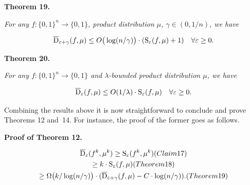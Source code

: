 \documentclass[10pt,a4paper]{article}
\begin{document}


\par\medskip\noindent\textbf{
\textbf{Theorem 19}\textbf{.}
}\par



\emph{For any $f\colon\{0,1\}^{n}\to\{0,1\}$, product distribution $\mu$, $\gamma\in(0,1/n)$, we have}\par


\[\begin{gathered}
\overline{{\textup{D}}}_{\varepsilon+\gamma}(f,\mu)\leq O\big{(}\log(n/\gamma)\big{)}\cdot({\textup{S}}_{\varepsilon}(f,\mu)+1)\quad\forall\varepsilon\geq 0.
\end{gathered}\]







\par\medskip\noindent\textbf{
\textbf{Theorem 20}\textbf{.}
}\par



\emph{For any $f\colon\{0,1\}^{n}\to\{0,1\}$ and $\lambda$-bounded product distribution $\mu$, we have}\par


\[\begin{gathered}
\overline{{\textup{D}}}_{\varepsilon}(f,\mu)\leq O(1/\lambda)\cdot{\textup{S}}_{\varepsilon}(f,\mu)\quad\forall\varepsilon\geq 0.
\end{gathered}\]






Combining the results above it is now straightforward to conclude and prove Theorems 12 and 14. For instance, the proof of the former goes as follows.\par




\par\medskip\noindent\textbf{Proof of Theorem 12.}\par




\[\begin{gathered}
\displaystyle\overline{{\textup{D}}}_{\varepsilon}(f^{k},\mu^{k}) \displaystyle\geq{\textup{S}}_{\varepsilon}(f^{k},\mu^{k}) (Claim 17) \\
\displaystyle\geq k\cdot{\textup{S}}_{\varepsilon}(f,\mu) (Theorem 18) \\
\displaystyle\geq\Omega\big{(}k/\log(n/\gamma)\big{)}\cdot(\overline{{\textup{D}}}_{\varepsilon+\gamma}(f,\mu)-C\cdot\log(n/\gamma)). (Theorem 19)
\end{gathered}\]
\end{document}

